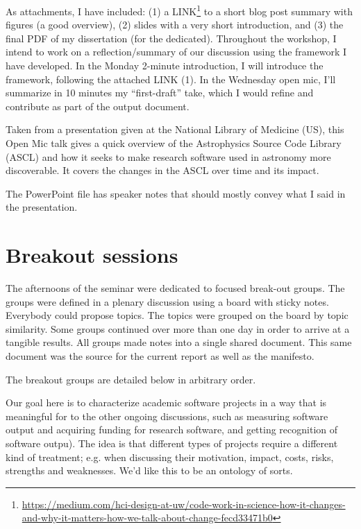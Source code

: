 \documentclass[a4paper,UKenglish]{dagrep}
\begin{document}
As attachments, I have included: (1) a LINK\footnote{\url{https://medium.com/hci-design-at-uw/code-work-in-science-how-it-changes-and-why-it-matters-how-we-talk-about-change-fecd33471b0} } to a short blog post summary with figures (a good overview), (2) slides with a very short introduction, and (3) the final PDF of my dissertation (for the dedicated). Throughout the workshop, I intend to work on a reflection/summary of our discussion using the framework I have developed. In the Monday 2-minute introduction, I will introduce the framework, following the attached LINK (1). In the Wednesday open mic, I'll summarize in 10 minutes my ``first-draft'' take, which I would refine and contribute as part of the output document.


Taken from a presentation given at the National Library of Medicine (US), this Open Mic talk gives a quick overview of the Astrophysics Source Code Library (ASCL) and how it seeks to make research software used in astronomy more discoverable. It covers the changes in the ASCL over time and its impact.

The PowerPoint file has speaker notes that should mostly convey what I said in the presentation.

\section{Breakout sessions}

The afternoons of the seminar were dedicated to focused break-out groups. The groups were defined in a plenary discussion using a board with sticky notes. Everybody could propose topics. The topics were grouped on the board by topic similarity. Some groups continued over more than one day in order to arrive at a tangible results. All groups made notes into a single shared document. This same document was the source for the current report as well as the manifesto.

The breakout groups are detailed below in arbitrary order.


Our goal here is to characterize academic software projects in a way that is meaningful for to the other ongoing discussions, such as measuring software output and acquiring funding for research software, and getting recognition of software outpu). The idea is that different types of projects require a different kind of treatment; e.g. when discussing their motivation, impact, costs, risks, strengths and weaknesses. We’d like this to be an ontology of sorts.
\end{document}
